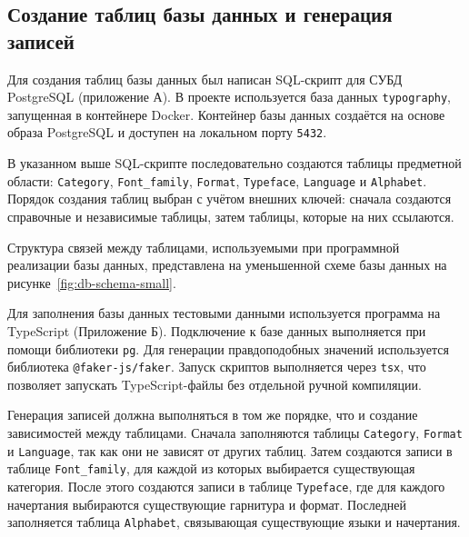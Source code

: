 \clearpage
{}
\label{fig:db-schema-ru}


\clearpage
{}
\label{fig:db-schema-eng}


\subsection{Создание таблиц базы данных и генерация записей}

Для создания таблиц базы данных был написан SQL-скрипт для СУБД PostgreSQL (приложение А). В проекте используется база данных \texttt{typography}, запущенная в контейнере Docker. Контейнер базы данных создаётся на основе образа PostgreSQL и доступен на локальном порту \texttt{5432}.

В указанном выше SQL-скрипте последовательно создаются таблицы предметной области: \texttt{Category}, \texttt{Font_family}, \texttt{Format}, \texttt{Typeface}, \texttt{Language} и \texttt{Alphabet}. Порядок создания таблиц выбран с учётом внешних ключей: сначала создаются справочные и независимые таблицы, затем таблицы, которые на них ссылаются.

Структура связей между таблицами, используемыми при программной реализации базы данных, представлена на уменьшенной схеме базы данных на рисунке~\ref{fig:db-schema-small}.

Для заполнения базы данных тестовыми данными используется программа на TypeScript (Приложение Б). Подключение к базе данных выполняется при помощи библиотеки \texttt{pg}. Для генерации правдоподобных значений используется библиотека \texttt{@faker-js/faker}. Запуск скриптов выполняется через \texttt{tsx}, что позволяет запускать TypeScript-файлы без отдельной ручной компиляции.

Генерация записей должна выполняться в том же порядке, что и создание зависимостей между таблицами. Сначала заполняются таблицы \texttt{Category}, \texttt{Format} и \texttt{Language}, так как они не зависят от других таблиц. Затем создаются записи в таблице \texttt{Font_family}, для каждой из которых выбирается существующая категория. После этого создаются записи в таблице \texttt{Typeface}, где для каждого начертания выбираются существующие гарнитура и формат. Последней заполняется таблица \texttt{Alphabet}, связывающая существующие языки и начертания.

